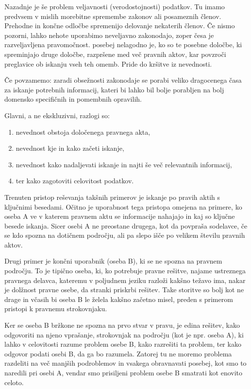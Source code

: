 \documentclass[a4paper,12pt,openright]{book}
\begin{document}
Nazadnje je še problem veljavnosti (verodostojnosti) podatkov. Tu imamo predvsem v mislih morebitne spremembe zakonov ali posameznih členov. Prehodne in končne odločbe spremenijo delovanje nekaterih členov. Če nismo pozorni, lahko nehote uporabimo neveljavno zakonodajo, zoper česa je razveljavljena pravomočnost. posebej nelagodno je, ko so te posebne določbe, ki spreminjajo druge določbe, razpršene med več pravnih aktov, kar povzroči preglavice ob iskanju vseh teh omemb. Pride do kršitve iz nevednosti.

Če povzamemo: zaradi obsežnosti zakonodaje se porabi veliko dragocenega časa za iskanje potrebnih informacij, kateri bi lahko bil bolje porabljen na bolj domensko specifičnih in pomembnih opravilih.

Glavni, a ne ekskluzivni, razlogi so:
\begin{enumerate}
    \item nevednost obstoja določenega pravnega akta,
    \item nevednost kje in kako začeti iskanje,
    \item nevednost kako nadaljevati iskanje in najti še več relevantnih informacij,
    \item ter kako zagotoviti celovitost podatkov.
\end{enumerate}

Trenuten pristop reševanja takšnih primerov je iskanje po pravih aktih s ključnimi besedami. Očitno je uporabnost tega pristopa omejena na primere, ko oseba A ve v katerem pravnem aktu se informacije nahajajo in kaj so ključne besede iskanja. Sicer osebi A ne preostane drugega, kot da povpraša sodelavce, če se kdo spozna na dotičnem področju, ali pa slepo išče po velikem številu pravnih aktov.

Drugi primer je končni uporabnik (oseba B), ki se ne spozna na pravnem področju. To je tipično oseba, ki, ko potrebuje pravne rešitve, najame ustreznega pravnega delavca, kateremu v poljudnem jeziku razloži kakšno težavo ima, nakar je dolžnost pravne osebe, da stranki priskrbi rešitev. Take storitve so bolj kot ne drage in včasih bi oseba B le želela kakšno začetno misel, preden s primerom pristopi k pravnemu strokovnjaku.

Ker se oseba B bržkone ne spozna na prvo stvar v pravu, je edina rešitev, kako odgovoriti na njeno vprašanje, strokovnjak na področju (kot je npr. oseba A), ki lahko v celovitosti razume problem osebe B, kako razrešiti ta problem, ter kako odgovor podati osebi B, da ga bo razumela. Zatorej tu ne moremo problema razdeliti na več manjših podroblemov in vsakega obravnavati posebej, kot smo to naredili pri osebi A, vendar smo prisiljeni problem osebe B smatrati kot enovito celoto.
\end{document}
